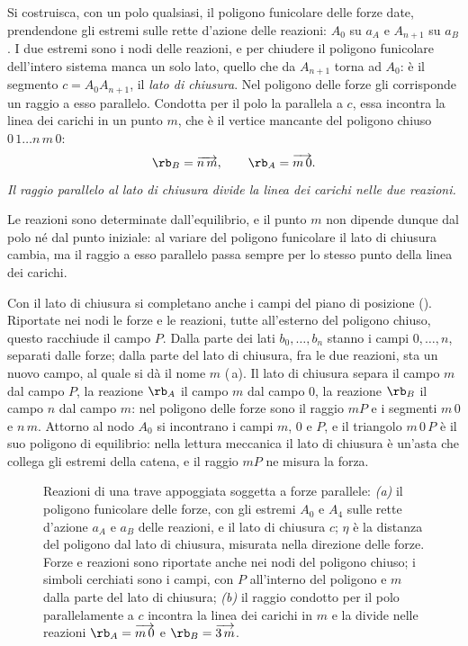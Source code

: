 Si costruisca, con un polo qualsiasi, il poligono funicolare delle forze date, prendendone gli
estremi sulle rette d'azione delle reazioni: $A_0$ su $a_A$ e $A_{n+1}$ su $a_B$. I due estremi
sono i nodi delle reazioni, e per chiudere il poligono funicolare dell'intero sistema manca un
solo lato, quello che da $A_{n+1}$ torna ad $A_0$: è il segmento $c = A_0A_{n+1}$, il \emph{lato
di chiusura}. Nel poligono delle forze gli corrisponde un raggio a esso parallelo. Condotta per
il polo la parallela a $c$, essa incontra la linea dei carichi in un punto $m$, che è il vertice
mancante del poligono chiuso $0\,1 \dots n\,m\,0$:
\begin{equation}
	\rb_B = \overrightarrow{n\,m} , \qquad \rb_A = \overrightarrow{m\,0} .
	\label{eq:reazioni_sgr}
\end{equation}
\emph{Il raggio parallelo al lato di chiusura divide la linea dei carichi nelle due reazioni.}

Le reazioni sono determinate dall'equilibrio, e il punto $m$ non dipende dunque dal polo né dal
punto iniziale: al variare del poligono funicolare il lato di chiusura cambia, ma il raggio a
esso parallelo passa sempre per lo stesso punto della linea dei carichi.

Con il lato di chiusura si completano anche i campi del piano di posizione
(). Riportate nei nodi le forze e le reazioni, tutte all'esterno
del poligono chiuso, questo racchiude il campo $P$. Dalla parte dei lati $b_0, \dots, b_n$ stanno i
campi $0, \dots, n$, separati dalle forze; dalla parte del lato di chiusura, fra le due reazioni,
sta un nuovo campo, al quale si dà il nome $m$ (\,a). Il lato di chiusura
separa il campo $m$ dal campo $P$, la reazione $\rb_A$ il campo $m$ dal campo $0$, la reazione
$\rb_B$ il campo $n$ dal campo $m$: nel poligono delle forze sono il raggio $mP$ e i segmenti
$m\,0$ e $n\,m$. Attorno al nodo $A_0$ si incontrano i campi $m$, $0$ e $P$, e il triangolo
$m\,0\,P$ è il suo poligono di equilibrio: nella lettura meccanica il lato di chiusura è un'asta
che collega gli estremi della catena, e il raggio $mP$ ne misura la forza.

\begin{figure}[htbp]
	\centering
	\caption{Reazioni di una trave appoggiata soggetta a forze parallele: \emph{(a)} il poligono
		funicolare delle forze, con gli estremi $A_0$ e $A_4$ sulle rette d'azione $a_A$ e $a_B$ delle
		reazioni, e il lato di chiusura $c$; $\eta$ è la distanza del poligono dal lato di chiusura,
		misurata nella direzione delle forze. Forze e reazioni sono riportate anche nei nodi del
		poligono chiuso; i simboli cerchiati sono i campi, con $P$ all'interno del poligono e $m$
		dalla parte del lato di chiusura; \emph{(b)} il raggio condotto per il polo parallelamente a
		$c$ incontra la linea dei carichi in $m$ e la divide nelle reazioni
		$\rb_A = \protect\overrightarrow{m\,0}$ e $\rb_B = \protect\overrightarrow{3\,m}$.}
	\label{fig:chiusura_sgr}
\end{figure}

